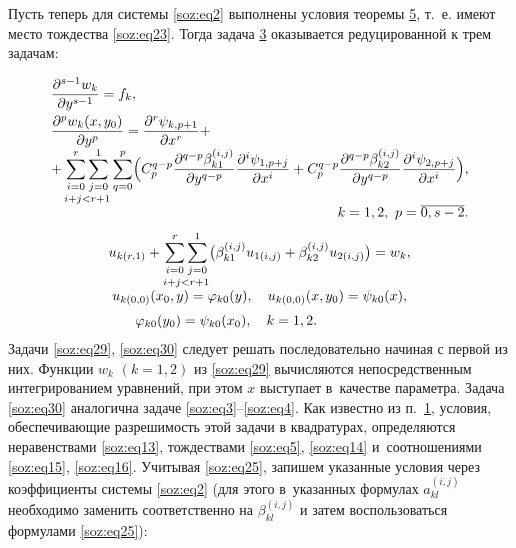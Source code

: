 Пусть теперь для системы \eqref{soz:eq2}  выполнены условия теоремы \hyperlink{soz:th5}{5}, т.~е. имеют место тождества \eqref{soz:eq23}. Тогда задача \hyperlink{soz:task3}{3} оказывается редуцированной к трем задачам:

\begin{equation}
\begin{array}{l}
\displaystyle
\frac{\partial^{s-1} w_{k}}{\partial y^{s-1}}=f_{k},\\[3mm] 
\displaystyle
\frac{\partial^{p} w_{k}(x,y_{0})}{\partial y^{p}}=\frac{\partial^{r}\psi_{k,p+1}}{\partial x^{r}}+
\\[2mm]
\displaystyle
+
\mathop{\sum\limits_{i=0}^{r}\sum\limits_{j=0}^{1}}\limits_{i + j < r+1} \sum\limits_{q=0}^{p} 
\Bigl(C_{p}^{q-p}\frac{\partial^{q-p}\beta^{(i,j)}_{k1}}{\partial y^{q-p}}\frac{\partial^{i}\psi_{1,p+j}}{\partial x^{i}}+
C_{p}^{q-p}\frac{\partial^{q-p}\beta^{(i,j)}_{k2}}{\partial y^{q-p}}\frac{\partial^{i}\psi_{2,p+j}}{\partial x^{i}} \Bigr),
\\  \hfill k=1, 2,\ p=\overline{0, s-2}.
\end{array}
\label{soz:eq29}
\end{equation}
\begin{equation}
\begin{array}{c}
\displaystyle
u_{k(r,1)}+\mathop{\sum\limits_{i=0}^{r}\sum\limits_{j=0}^{1}}\limits_{i + j < r+1} 
\bigl(\beta_{k1}^{(i,j)}u_{1(i,j)}+\beta_{k2}^{(i,j)}u_{2(i,j)}\bigr)=w_{k},
\\[6mm]
u_{k(0,0)}(x_{0},y)=\varphi_{k0}(y),\quad u_{k(0,0)}(x,y_{0})=\psi_{k0}(x),\\[2mm]
\varphi_{k0}(y_{0})=\psi_{k0}(x_{0}),\quad k=1, 2. \hspace{1.5cm} \phantom{1}
\end{array}
\label{soz:eq30}
\end{equation}
Задачи \eqref{soz:eq29}, \eqref{soz:eq30} следует решать последовательно начиная с первой из них.
Функции $w_{k}$ $(k=1, 2)$ из \eqref{soz:eq29}  вычисляются непосредственным интегрированием уравнений, 
при этом $x$ выступает в~качестве параметра. 
Задача \eqref{soz:eq30}  аналогична  задаче \eqref{soz:eq3}--\eqref{soz:eq4}. 
Как известно из п.~\hyperlink{soz:p1}{1}, условия, обеспечивающие разрешимость этой задачи в квадратурах, определяются неравенствами \eqref{soz:eq13}, тождествами \eqref{soz:eq5}, \eqref{soz:eq14}  и~соотношениями \eqref{soz:eq15}, \eqref{soz:eq16}. 
Учитывая \eqref{soz:eq25}, запишем указанные условия через коэффициенты системы \eqref{soz:eq2}  (для этого в~указанных формулах $a_{kl}^{(i,j)}$ необходимо заменить соответственно на $\beta_{kl}^{(i,j)}$ и затем воспользоваться формулами \eqref{soz:eq25}):

